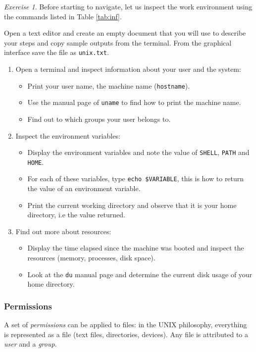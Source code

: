 \documentclass[onecolumn, oneside, a4paper, 11pt]{memoir}
\theoremstyle{remark}
\newtheorem{ex}{Exercise}
\begin{document}
\begin{ex}
Before starting to navigate, let us inspect the work environment using the commands listed in Table \ref{tab:inf}.

Open a text editor and create an empty document that you will use to describe your steps and copy sample outputs from the terminal.
From the graphical interface save the file as \texttt{unix.txt}.
\begin{enumerate}
\item Open a terminal and inspect information about your user and the system:
\begin{itemize}
\item Print your user name, the machine name (\texttt{hostname}).
\item Use the manual page of \texttt{uname} to find how to print the machine name.
\item Find out to which groups your user belongs to.
\end{itemize}
\item Inspect the environment variables:
\begin{itemize}
\item Display the environment variables and note the value of \texttt{SHELL}, \texttt{PATH} and \texttt{HOME}.
\item For each of these variables, type \texttt{echo \$VARIABLE}, this is how to return the value of an environment variable.
\item Print the current working directory and observe that it is your home directory, i.e the value returned.
\end{itemize}
\item Find out more about resources:
\begin{itemize}
\item Display the time elapsed since the machine was booted and inspect the resources (memory, processes, disk space).
\item Look at the \texttt{du} manual page and determine the current disk usage of your home directory.
\end{itemize}
\end{enumerate}
\end{ex}

\subsubsection{Permissions}

A set of \textit{permissions} can be applied to files: in the UNIX philosophy, everything is represented as a file (text files, directories, devices).
Any file is attributed to a \textit{user} and a \textit{group}.
\end{document}
